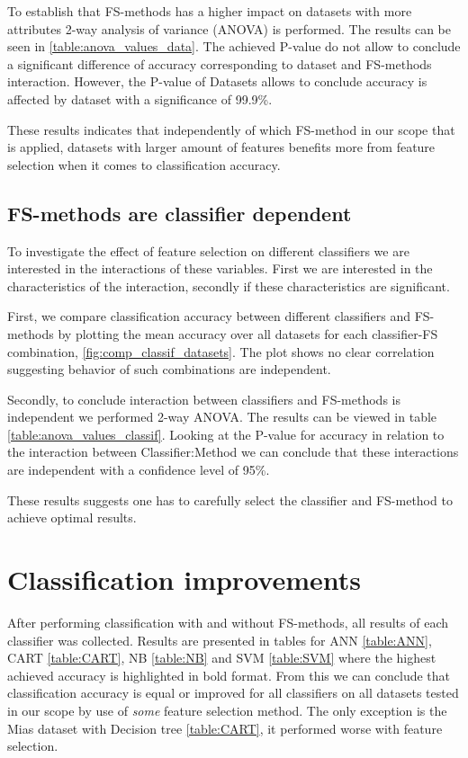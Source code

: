 To establish that FS-methods has a higher impact on datasets with more attributes 2-way analysis of variance (ANOVA) is performed. The results can be seen in \ref{table:anova_values_data}. The achieved P-value do not allow to conclude a significant difference of accuracy corresponding to dataset and FS-methods interaction. However, the P-value of Datasets allows to conclude accuracy is affected by dataset with a significance of 99.9\%.



These results indicates that independently of which FS-method in our scope that is applied, datasets with larger amount of features benefits more from feature selection when it comes to classification accuracy.

\subsection{FS-methods are classifier dependent}

To investigate the effect of feature selection on different classifiers we are interested in the interactions of these variables. First we are interested in the characteristics of the interaction, secondly if these characteristics are significant.

First, we compare classification accuracy between different classifiers and FS-methods by plotting the mean accuracy over all datasets for each classifier-FS combination, \ref{fig:comp_classif_datasets}. The plot shows no clear correlation suggesting behavior of such combinations are independent.

Secondly, to conclude interaction between classifiers and FS-methods is independent we performed 2-way ANOVA. The results can be viewed in table \ref{table:anova_values_classif}. Looking at the P-value for accuracy in relation to the interaction between Classifier:Method we can conclude that these interactions are independent with a confidence level of 95\%.



These results suggests one has to carefully select the classifier and FS-method to achieve optimal results.


\section{Classification improvements}

After performing classification with and without FS-methods, all results of each classifier was collected. Results are presented in tables for ANN \ref{table:ANN}, CART \ref{table:CART}, NB \ref{table:NB} and SVM \ref{table:SVM} where the highest achieved accuracy is highlighted in bold format. From this we can conclude that classification accuracy is equal or improved for all classifiers on all datasets tested in our scope by use of \textit{some} feature selection method. The only exception is the Mias dataset with Decision tree \ref{table:CART}, it performed worse with feature selection.

